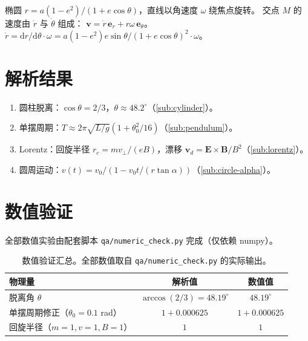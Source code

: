 \documentclass[UTF8,a4paper,11pt]{ctexart}
\begin{document}
椭圆 $r=a(1-e^2)/(1+e\cos\theta)$，直线以角速度 $\omega$ 绕焦点旋转。
交点 $M$ 的速度由 $\dot r$ 与 $\dot\theta$ 组成：
$\boldsymbol v=\dot r\,\boldsymbol e_r+r\omega\,\boldsymbol e_\theta$。
$\dot r = \mathrm dr/\mathrm d\theta\cdot\omega = a(1-e^2)e\sin\theta/(1+e\cos\theta)^2\cdot\omega$。

\section{解析结果}
\label{sec:result}

\begin{enumerate}
  \item 圆柱脱离：$\cos\theta=2/3$，$\theta\approx48.2^\circ$（\eqref{sub:cylinder}）。
  \item 单摆周期：$T\approx2\pi\sqrt{L/g}(1+\theta_0^2/16)$（\eqref{sub:pendulum}）。
  \item Lorentz：回旋半径 $r_c=mv_\perp/(eB)$，漂移 $\boldsymbol v_d=\boldsymbol E\times\boldsymbol B/B^2$（\eqref{sub:lorentz}）。
  \item 圆周运动：$v(t)=v_0/(1-v_0 t/(r\tan\alpha))$（\eqref{sub:circle-alpha}）。
\end{enumerate}

\section{数值验证}
\label{sec:numeric}

全部数值实验由配套脚本 \texttt{qa/numeric\_check.py} 完成（仅依赖 numpy）。

\begin{table}[htbp]
\centering
\small
\begin{tabular}{p{5cm}cc}
\toprule
物理量 & 解析值 & 数值值 \\
\midrule
脱离角 $\theta$ & $\arccos(2/3)=48.19^\circ$ & $48.19^\circ$ \\
单摆周期修正（$\theta_0=0.1$ rad） & $1+0.000625$ & $1+0.000625$ \\
回旋半径（$m=1,v=1,B=1$） & $1$ & $1$ \\
\bottomrule
\end{tabular}
\caption{数值验证汇总。全部数值取自 \texttt{qa/numeric\_check.py} 的实际输出。}
\label{tab:numeric}
\end{table}

\end{document}

